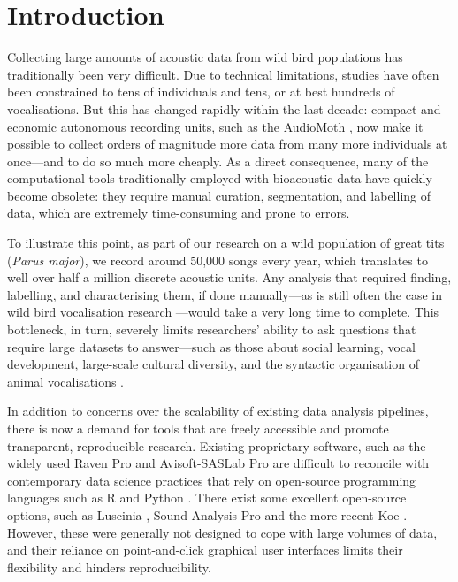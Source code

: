 \section{Introduction}

Collecting large amounts of acoustic data from wild bird populations has
traditionally been very difficult. Due to technical limitations, studies have
often been constrained to tens of individuals and tens, or at best hundreds of
vocalisations. But this has changed rapidly within the last decade: compact and
economic autonomous recording units, such as the AudioMoth \parencite{hill2019}, now
make it possible to collect orders of magnitude more data from many more
individuals at once---and to do so much more cheaply. As a direct consequence,
many of the computational tools traditionally employed with bioacoustic data
have quickly become obsolete: they require manual curation, segmentation, and
labelling of data, which are extremely time-consuming and prone to errors.

To illustrate this point, as part of our research on a wild population of great
tits (\textit{Parus major}), we record around 50,000 songs every year, which
translates to well over half a million discrete acoustic units. Any analysis
that required finding, labelling, and characterising them, if done manually---as
is still often the case in wild bird vocalisation research \parencite{beecher2020a,
demko2018, mclean2020, pipek2018, youngblood2022}---would take a very long time to
complete. This bottleneck, in turn, severely limits researchers' ability to ask
questions that require large datasets to answer---such as those about social
learning, vocal development, large-scale cultural diversity, and the syntactic
organisation of animal vocalisations \parencite{aplin2019, kollmorgen2020,
lachlan2018, sainburg2019}.

In addition to concerns over the scalability of existing data analysis
pipelines, there is now a demand for tools that are freely accessible and
promote transparent, reproducible research. Existing proprietary software, such
as the widely used Raven Pro \cite[up to \$800,][]{raven2019} and Avisoft-SASLab
Pro \parencite[up to \$2,835,][]{specht2002} are difficult to reconcile with
contemporary data science practices that rely on open-source programming
languages such as R \parencite{rcoreteam2021} and Python \parencite{vanrossum1995}.
There exist some excellent open-source options, such as Luscinia
\parencite{lachlan2016a}, Sound Analysis Pro \parencite{tchernichovski2000} and the more
recent Koe \parencite{fukuzawa2020}. However, these were generally not designed to
cope with large volumes of data, and their reliance on point-and-click graphical
user interfaces limits their flexibility and hinders reproducibility.

